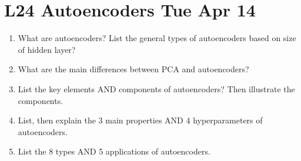 \documentclass[12pt]{article}
\newenvironment{QandA}{\begin{enumerate}[label=\bfseries\arabic*.]\bfseries}
{\end{enumerate}}
\newenvironment{answered}{\par\normalfont\color{Sepia}}{}
\begin{document}
\section*{L24 Autoencoders \textemdash{} Tue Apr 14}
\begin{QandA}
    \item What are autoencoders? List the general types of autoencoders based on size of hidden layer?
    \begin{answered}
    \end{answered}

    \item What are the main differences between PCA and autoencoders?
    \begin{answered}
    \end{answered}

    \item List the key elements AND components of autoencoders? Then illustrate the components.
    \begin{answered}
    \end{answered}

    \item List, then explain the 3 main properties AND 4 hyperparameters of autoencoders.
    \begin{answered}
    \end{answered}

    \item List the 8 types AND 5 applications of autoencoders.
    \begin{answered}
    \end{answered}

\end{QandA}
\end{document}
